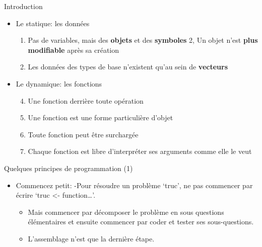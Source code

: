 \documentclass[
  ignorenonframetext,
]{beamer}
\providecommand{\tightlist}{%
  \setlength{\itemsep}{0pt}\setlength{\parskip}{0pt}}
\begin{document}
\begin{frame}{Introduction}
\protect\hypertarget{introduction-1}{}
\begin{itemize}
\tightlist
\item
  Le statique: les données

  \begin{enumerate}
  \tightlist
  \item
    Pas de variables, mais des \textbf{objets} et des \textbf{symboles}
    2, Un objet n'est \textbf{plus modifiable} après sa création
  \item
    Les données des types de base n'existent qu'au sein de
    \textbf{vecteurs}
  \end{enumerate}
\item
  Le dynamique: les fonctions

  \begin{enumerate}
  \setcounter{enumi}{3}
  \tightlist
  \item
    Une fonction derrière toute opération
  \item
    Une fonction est une forme particulière d'objet
  \item
    Toute fonction peut être surchargée
  \item
    Chaque fonction est libre d'interpréter ses arguments comme elle le
    veut
  \end{enumerate}
\end{itemize}
\end{frame}

\begin{frame}{Quelques principes de programmation (1)}
\protect\hypertarget{quelques-principes-de-programmation-1}{}
\begin{itemize}
\tightlist
\item
  Commencez petit: -Pour résoudre un problème `truc', ne pas commencer
  par écrire `truc \textless- function\ldots{}'.

  \begin{itemize}
  \tightlist
  \item
    Mais commencer par décomposer le problème en sous questions
    élémentaires et ensuite commencer par coder et tester ses
    sous-questions.
  \item
    L'assemblage n'est que la dernière étape.
  \end{itemize}
\end{itemize}
\end{frame}
\end{document}
